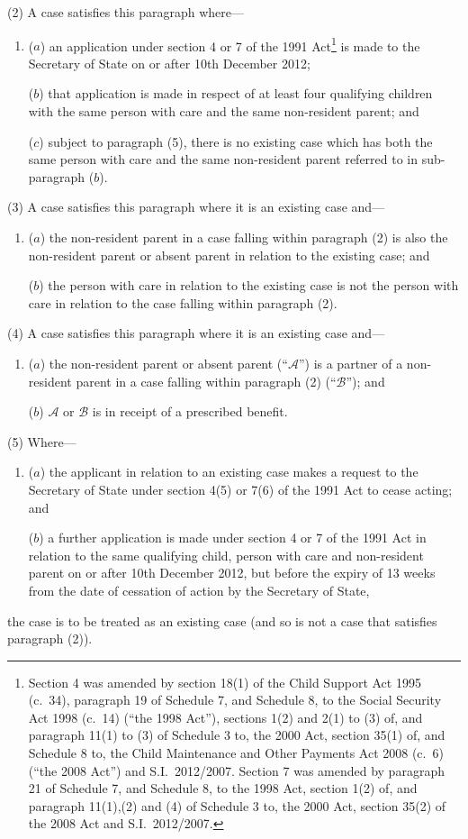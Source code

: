 \documentclass[12pt,a4paper]{article}
\begin{document}
(2) A case satisfies this paragraph where—
\begin{enumerate}\item[]
($a$) an application under section 4 or 7 of the 1991 Act\footnote{Section 4 was amended by section 18(1) of the Child Support Act 1995 (c.~34), paragraph 19 of Schedule 7, and Schedule 8, to the Social Security Act 1998 (c.~14) (“the 1998 Act”), sections 1(2) and 2(1) to (3) of, and paragraph 11(1) to (3) of Schedule 3 to, the 2000 Act, section 35(1) of, and Schedule 8 to, the Child Maintenance and Other Payments Act 2008 (c.~6) (“the 2008 Act”) and S.I.~2012/2007. Section 7 was amended by paragraph 21 of Schedule 7, and Schedule 8, to the 1998 Act, section 1(2) of, and paragraph 11(1),(2) and (4) of Schedule 3 to, the 2000 Act, section 35(2) of the 2008 Act and S.I.~2012/2007.} is made to the Secretary of State on or after 10th December 2012;

($b$) that application is made in respect of at least four qualifying children with the same person with care and the same non-resident parent; and

($c$) subject to paragraph (5), there is no existing case which has both the same person with care and the same non-resident parent referred to in sub-paragraph ($b$).
\end{enumerate}

(3) A case satisfies this paragraph where it is an existing case and—
\begin{enumerate}\item[]
($a$) the non-resident parent in a case falling within paragraph (2) is also the non-resident parent or absent parent in relation to the existing case; and

($b$) the person with care in relation to the existing case is not the person with care in relation to the case falling within paragraph (2).
\end{enumerate}

(4) A case satisfies this paragraph where it is an existing case and—
\begin{enumerate}\item[]
($a$) the non-resident parent or absent parent (“$\mathcal{A}$”) is a partner of a non-resident parent in a case falling within paragraph (2) (“$\mathcal{B}$”); and

($b$) $\mathcal{A}$ or $\mathcal{B}$ is in receipt of a prescribed benefit.
\end{enumerate}

(5) Where—
\begin{enumerate}\item[]
($a$) the applicant in relation to an existing case makes a request to the Secretary of State under section 4(5) or 7(6) of the 1991 Act to cease acting; and

($b$) a further application is made under section 4 or 7 of the 1991 Act in relation to the same qualifying child, person with care and non-resident parent on or after 10th December 2012, but before the expiry of 13 weeks from the date of cessation of action by the Secretary of State,
\end{enumerate}
the case is to be treated as an existing case (and so is not a case that satisfies paragraph (2)).
\end{document}

